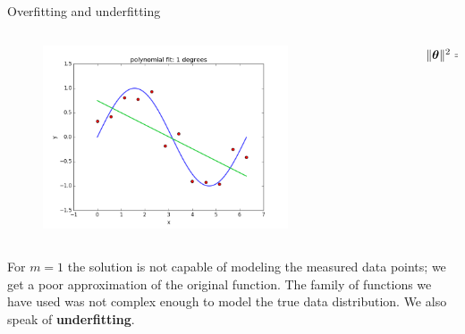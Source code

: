 \documentclass[xcolor=pdftex,dvipsnames,table]{beamer}
\begin{document}
\begin{frame}{Overfitting and underfitting}
\begin{columns}
\begin{column}{.8\textwidth}
\begin{figure}[htb]
	\includegraphics[width=0.75\textwidth]{../graphics/polyfit_degree_1.png}
\end{figure}
\end{column}
\begin{column}{.2\textwidth}
$\| \boldsymbol{\theta} \|^2 = 0.67$
\end{column}
\end{columns}
For $m=1$ the solution is not capable of modeling the measured data points; we get a poor approximation of the original function. The family of functions we have used was not complex enough to model the true data distribution. We also speak of \textbf{underfitting}.
\end{frame}
\end{document}
